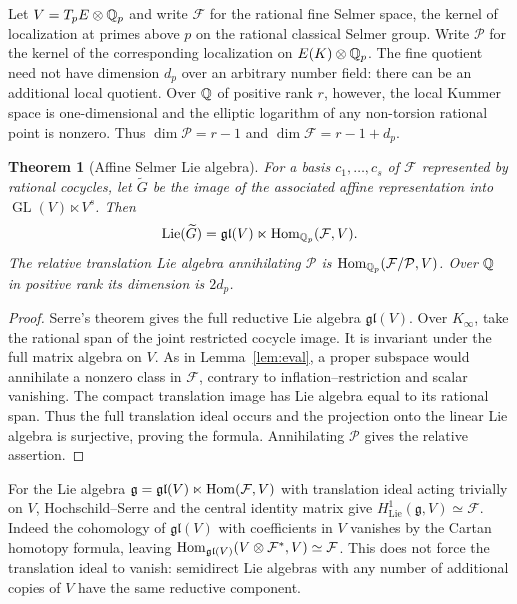 \documentclass[11pt,a4paper]{article}
\newtheorem{theorem}{Theorem}[section]
\theoremstyle{definition}\newtheorem{definition}[theorem]{Definition}
\theoremstyle{remark}\newtheorem{remark}[theorem]{Remark}
\numberwithin{equation}{section}
\begin{document}
Let $V=T_pE\otimes\mathbb Q_p$ and write $\mathcal F$ for the rational fine Selmer space, the kernel of localization at primes above $p$ on the rational classical Selmer group. Write $\mathcal P$ for the kernel of the corresponding localization on $E(K)\otimes\mathbb Q_p$. The fine quotient need not have dimension $d_p$ over an arbitrary number field: there can be an additional local quotient. Over $\mathbb Q$ of positive rank $r$, however, the local Kummer space is one-dimensional and the elliptic logarithm of any non-torsion rational point is nonzero. Thus $\dim\mathcal P=r-1$ and $\dim\mathcal F=r-1+d_p$.
\begin{theorem}[Affine Selmer Lie algebra]\label{thm:lie}
For a basis $c_1,\ldots,c_s$ of $\mathcal F$ represented by rational cocycles, let $\widetilde G$ be the image of the associated affine representation into $\operatorname{GL}(V)\ltimes V^s$. Then
\[
\operatorname{Lie}(\widetilde G)=\mathfrak{gl}(V)\ltimes\operatorname{Hom}_{\mathbb Q_p}(\mathcal F,V).
\]
The relative translation Lie algebra annihilating $\mathcal P$ is $\operatorname{Hom}_{\mathbb Q_p}(\mathcal F/\mathcal P,V)$. Over $\mathbb Q$ in positive rank its dimension is $2d_p$.
\end{theorem}
\begin{proof}
Serre's theorem gives the full reductive Lie algebra $\mathfrak{gl}(V)$. Over $K_\infty$, take the rational span of the joint restricted cocycle image. It is invariant under the full matrix algebra on $V$. As in Lemma~\ref{lem:eval}, a proper subspace would annihilate a nonzero class in $\mathcal F$, contrary to inflation--restriction and scalar vanishing. The compact translation image has Lie algebra equal to its rational span. Thus the full translation ideal occurs and the projection onto the linear Lie algebra is surjective, proving the formula. Annihilating $\mathcal P$ gives the relative assertion.
\end{proof}
For the Lie algebra $\mathfrak g=\mathfrak{gl}(V)\ltimes\operatorname{Hom}(\mathcal F,V)$ with translation ideal acting trivially on $V$, Hochschild--Serre and the central identity matrix give $H^1_{\mathrm{Lie}}(\mathfrak g,V)\simeq\mathcal F$. Indeed the cohomology of $\mathfrak{gl}(V)$ with coefficients in $V$ vanishes by the Cartan homotopy formula, leaving $\operatorname{Hom}_{\mathfrak{gl}(V)}(V\otimes\mathcal F^*,V)\simeq\mathcal F$. This does not force the translation ideal to vanish: semidirect Lie algebras with any number of additional copies of $V$ have the same reductive component.
\end{document}
